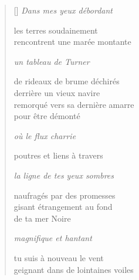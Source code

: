 \documentclass[12pt,a4paper]{article}
\begin{document}
\begin{verse}[\versewidth]
  \emph{Dans mes yeux débordant}

  les terres soudainement \\
  rencontrent une marée montante

  \emph{un tableau de Turner}

  de rideaux de brume déchirés \\
  derrière un vieux navire \\
  remorqué vers sa dernière amarre \\
  pour être démonté

  \emph{où le flux charrie}

  poutres et liens à travers

  \emph{la ligne de tes yeux sombres}

  naufragés par des promesses \\
  gisant étrangement au fond \\
  de ta mer Noire

  \emph{magnifique et hantant}

  tu suis à nouveau le vent \\
  geignant dans de lointaines voiles
\end{verse}


\newpage

\poemtitle{}

\settowidth{\versewidth}{Vous ne pouvez que ressentir et je vois}

\bigskip
\end{document}
